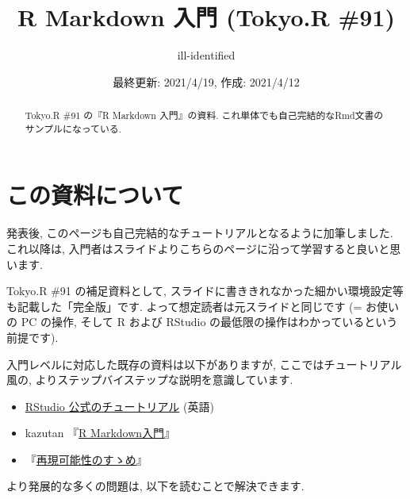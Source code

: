 \documentclass[
]{ltjsarticle}
\title{R Markdown 入門 (Tokyo.R \#91)}
\author{ill-identified}
\date{最終更新: 2021/4/19, 作成: 2021/4/12}
\providecommand{\tightlist}{%
  \setlength{\itemsep}{0pt}\setlength{\parskip}{0pt}}
\newenvironment{infobox}[1]{\begin{itemize}\renewcommand{\labelitemi}{\raisebox{-.7\height}[0pt][0pt]{%
  {\setkeys{Gin}{width=3em,keepaspectratio}\texttt{[image: \_latex/\_img/\#1]}}}}
  \setlength{\fboxsep}{1em}
  \begin{greyblock}
  \item
  }{\end{greyblock}\end{itemize}
}
\begin{document}
\maketitle
\begin{abstract}
Tokyo.R \#91 の『R Markdown 入門』の資料. これ単体でも自己完結的なRmd文書のサンプルになっている.
\end{abstract}

{
\setcounter{tocdepth}{2}
\tableofcontents
}
\newpage

\hypertarget{intro}{%
\section*{この資料について}\label{intro}}

\begin{infobox}{important}
発表後, このページも自己完結的なチュートリアルとなるように加筆しました. これ以降は, 入門者はスライドよりこちらのページに沿って学習すると良いと思います.

\end{infobox}

Tokyo.R \#91 の補足資料として, スライドに書ききれなかった細かい環境設定等も記載した「完全版」です. よって想定読者は元スライドと同じです (= お使いの PC の操作, そして R および RStudio の最低限の操作はわかっているという前提です).

入門レベルに対応した既存の資料は以下がありますが, ここではチュートリアル風の, よりステップバイステップな説明を意識しています.

\begin{itemize}
\tightlist
\item
  \href{https://rmarkdown.rstudio.com/lesson-1.html}{RStudio 公式のチュートリアル} (英語)
\item
  kazutan 『\href{https://kazutan.github.io/kazutanR/Rmd_intro.html}{R Markdown入門}』
\item
  \citet{Takahashi2018}『\href{https://www.kyoritsu-pub.co.jp/bookdetail/9784320112438}{再現可能性のすゝめ}』
\end{itemize}

より発展的な多くの問題は, 以下を読むことで解決できます.
\end{document}
